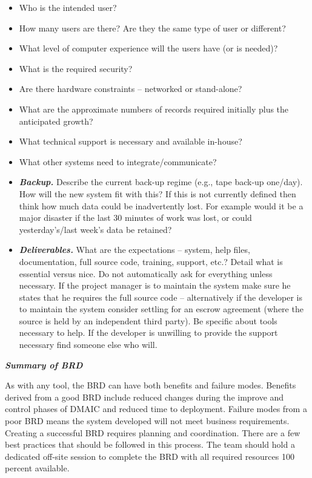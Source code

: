 \documentclass{article}
\begin{document}
{\begin{itemize}
    \item Who is the intended user?
    \item How many users are there? Are they the same type of user or different?
    \item What level of computer experience will the users have (or is needed)? 
    \item What is the required security?
    \item Are there hardware constraints – networked or stand-alone?
    \item What are the approximate numbers of records required initially plus the anticipated growth? 
    \item What technical support is necessary and available in-house? 
    \item What other systems need to integrate/communicate?
    \item \textbf{\textit{Backup.}} Describe the current back-up regime (e.g., tape back-up one/day). How will the new system fit with this? If this is not currently defined then think how much data could be inadvertently lost. For example would it be a major disaster if the last 30 minutes of work was lost, or could yesterday’s/last week’s data be retained?
    \item \textbf{\textit{Deliverables.}} What are the expectations – system, help files, documentation, full source code, training, support, etc.? Detail what is essential versus nice. Do not automatically ask for everything unless necessary. If the project manager is to maintain the system make sure he states that he requires the full source code – alternatively if the developer is to maintain the system consider settling for an escrow agreement (where the source is held by an independent third party). Be specific about tools necessary to help. If the developer is unwilling to provide the support necessary find someone else who will.
\end{itemize}

\vspace{0.3cm}

\hspace{-0.67cm} \textbf{\textit{Summary of BRD}}

\vspace{0.25cm}

As with any tool, the BRD can have both benefits and failure modes. Benefits derived from a good BRD include reduced changes during the improve and control phases of DMAIC and reduced time to deployment. Failure modes from a poor BRD means the system developed will not meet business requirements. Creating a successful BRD requires planning and coordination. There are a few best practices that should be followed in this process. The team should hold a dedicated off-site session to complete the BRD with all required resources 100 percent available. 

}
\end{document}
